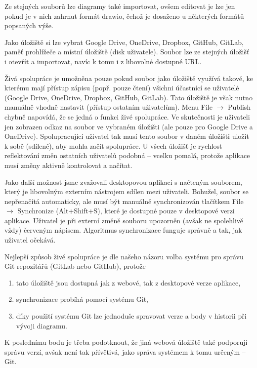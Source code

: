 Ze stejných souborů lze diagramy také importovat, ovšem editovat je lze jen
pokud je v nich zahrnut formát drawio, čehož je dosaženo u některých formátů
popsaných výše.

Jako úložiště si lze vybrat Google Drive, OneDrive, Dropbox, GitHub, GitLab,
paměť prohlížeče a místní úložiště (disk uživatele). Soubor lze ze stejných
úložišť i otevřít a importovat, navíc k tomu i z libovolné dostupné URL.

Živá spolupráce je umožněna pouze pokud soubor jako úložiště využívá takové, ke
kterému mají přístup zápisu (popř. pouze čtení) všichni účastnící se uživatelé
(Google Drive, OneDrive, Dropbox, GitHub, GitLab). Tato úložiště je však nutno
manuálně vhodně nastavit (přístup ostatním uživatelům). Menu File $\rightarrow$
Publish chybně napovídá, že se jedná o funkci živé spolupráce. Ve skutečnosti je
uživateli jen zobrazen odkaz na soubor ve vybraném úložišti (ale pouze pro
Google Drive a OneDrive). Spolupracující uživatel tak musí tento soubor v daném
úložišti uložit k sobě (sdíleně), aby mohla začít spolupráce. U všech úložišť je
rychlost reflektování změn ostatních uživatelů podobná -- vcelku pomalá, protože
aplikace musí změny aktivně kontrolovat a načítat.

Jako další možnost jsme zvažovali desktopovou aplikaci s načteným souborem,
který je libovolným externím nástrojem sdílen mezi uživateli. Bohužel, soubor se
nepřenačítá automaticky, ale musí být manuálně synchronizován tlačítkem File
$\rightarrow$ Synchronize (Alt+Shift+S), které je dostupné pouze v desktopové
verzi aplikace. Uživatel je při externí změně souboru upozorněn (avšak ne
spolehlivě vždy) červeným nápisem. Algoritmus synchronizace funguje správně a
tak, jak uživatel očekává.

Nejlepší způsob živé spolupráce je dle našeho názoru volba systému pro správu
Git repozitářů (GitLab nebo GitHub), protože
\begin{enumerate}
  \item tato úložiště jsou dostupná jak z webové, tak z desktopové verze
  aplikace,
  \item synchronizace probíhá pomocí systému Git,
  \item díky použití systému Git lze jednoduše spravovat verze a body v historii
  při vývoji diagramu.
\end{enumerate} 

K poslednímu bodu je třeba podotknout, že jiná webová úložiště také podporují
správu verzí, avšak není tak přívětivá, jako správa systémem k tomu určeným --
Git.

